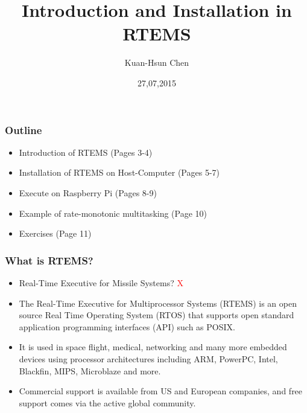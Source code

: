 \documentclass[t]{beamer}
\title{Introduction and Installation in RTEMS}
\author{Kuan-Hsun Chen}
\institute{LS 12, TU Dortmund}
\date{27,07,2015}
\newcommand{\red}[1]{\textcolor{red}{#1}}
\begin{document}
\maketitle

\begin{frame}
\frametitle{Outline}

\begin{itemize}

\item Introduction of RTEMS (Pages 3-4)
\label{sec-1-1}%

\item Installation of RTEMS on Host-Computer (Pages 5-7)
\label{sec-1-2}%

\item Execute on Raspberry Pi (Pages 8-9)
\label{sec-1-3}%

\item Example of rate-monotonic multitasking (Page 10)
\label{sec-1-3}%

\item Exercises (Page 11)
\label{sec-1-4}%

\end{itemize} %
\end{frame}

\begin{frame}
\frametitle{What is RTEMS?}
\label{sec-2}
\begin{itemize}

\item Real-Time Executive for Missile Systems? \red{X}
\label{sec-2-1}%
\item The Real-Time Executive for Multiprocessor Systems (RTEMS) is an open source Real Time Operating System (RTOS) that supports open standard application programming interfaces (API) such as POSIX. 
\label{sec-2-2}%
\item It is used in space flight, medical, networking and many more embedded devices using processor 
architectures including ARM, PowerPC, Intel, Blackfin, MIPS, Microblaze and more. 
\label{sec-2-3}%
\item Commercial support is available from US and European companies, and free support comes via the active global community.
\label{sec-2-4}%

\end{itemize} %
\end{frame}
\end{document}
